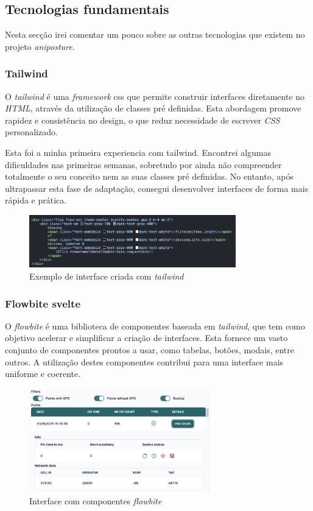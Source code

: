 \clearpage
\subsection{Tecnologias fundamentais}\label{sec:tec_fund_ani} %

Nesta secção irei comentar um pouco sobre as outras tecnologias que existem no projeto \textit{aniposture}. 

\subsubsection{\textbf{Tailwind}}
O \textit{tailwind} é uma \textit{framework} css que permite construir interfaces diretamente no \textit{HTML}, através da utilização de classes pré definidas. Esta abordagem promove rapidez e consistência no design, o que reduz necessidade de escrever \textit{CSS} personalizado.

Esta foi a minha primeira experiencia com tailwind. Encontrei algumas dificuldades nas primeiras semanas, sobretudo por ainda não compreender totalmente o seu conceito nem as suas classes pré definidas. No entanto, após ultrapassar esta fase de adaptação, consegui desenvolver interfaces de forma mais rápida e prática.

\begin{figure}[h!]
    \centering
    \includegraphics[width=0.8\textwidth]{figs/tailwind.png}
    \caption{Exemplo de interface criada com \textit{tailwind}}
    \label{fig:tailwind}
\end{figure}

\subsubsection{\textbf{Flowbite svelte}}
O \textit{flowbite} é uma biblioteca de componentes baseada em \textit{tailwind}, que tem como objetivo acelerar e simplificar a criação de interfaces. Esta fornece um vasto conjunto de componentes prontos a usar, como tabelas, botões, modais, entre outros. A utilização destes componentes contribui para uma interface mais uniforme e coerente.

\begin{figure}[h!]
    \centering
    \includegraphics[width=0.7\textwidth]{figs/flowbite.png}
    \caption{Interface com componentes \textit{flowbite}}
    \label{fig:flowbite}
\end{figure}

